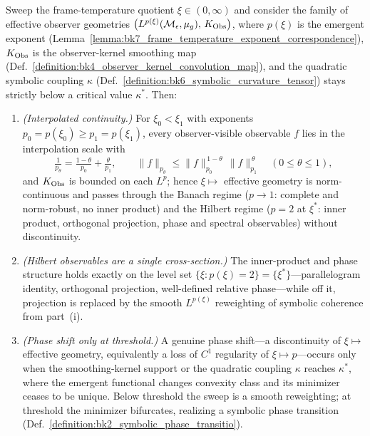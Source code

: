 \begin{theorem}
\label{theorem:bk7_hilbert_banach_bridge}
Sweep the frame-temperature quotient $\xi\in(0,\infty)$ and consider the family of
effective observer geometries
$\bigl(L^{p(\xi)}(\mathcal{M}_{\epsilon},\mu_{g}),\,K_{\mathrm{Obs}}\bigr)$, where
$p(\xi)$ is the emergent exponent
(Lemma~\ref{lemma:bk7_frame_temperature_exponent_correspondence}), $K_{\mathrm{Obs}}$ is
the observer-kernel smoothing map
(Def.~\ref{definition:bk4_observer_kernel_convolution_map}), and the quadratic
symbolic coupling $\kappa$ (Def.~\ref{definition:bk6_symbolic_curvature_tensor})
stays strictly below a critical value $\kappa^{\ast}$. Then:
\begin{enumerate}
\item \emph{(Interpolated continuity.)} For $\xi_{0}<\xi_{1}$ with exponents
$p_{0}=p(\xi_{0})\ge p_{1}=p(\xi_{1})$, every observer-visible observable $f$ lies
in the interpolation scale with
\[
\tfrac{1}{p_{\theta}}=\tfrac{1-\theta}{p_{0}}+\tfrac{\theta}{p_{1}},
\qquad
\lVert f\rVert_{p_{\theta}}\le
\lVert f\rVert_{p_{0}}^{\,1-\theta}\,\lVert f\rVert_{p_{1}}^{\,\theta}
\quad(0\le\theta\le 1),
\]
and $K_{\mathrm{Obs}}$ is bounded on each $L^{p}$; hence $\xi\mapsto$ effective geometry is
norm-continuous and passes through the Banach regime ($p\to 1$: complete and
norm-robust, no inner product) and the Hilbert regime ($p=2$ at $\xi^{\ast}$:
inner product, orthogonal projection, phase and spectral observables) without
discontinuity.
\item \emph{(Hilbert observables are a single cross-section.)} The
inner-product and phase structure holds exactly on the level set
$\{\xi:p(\xi)=2\}=\{\xi^{\ast}\}$---parallelogram identity, orthogonal
projection, well-defined relative phase---while off it, projection is
replaced by the smooth $L^{p(\xi)}$ reweighting of symbolic coherence
from part~(i).
\item \emph{(Phase shift only at threshold.)} A genuine phase shift---a
discontinuity of $\xi\mapsto$ effective geometry, equivalently a loss of $C^{1}$
regularity of $\xi\mapsto p$---occurs only when the smoothing-kernel support or the
quadratic coupling $\kappa$ reaches $\kappa^{\ast}$, where the emergent functional
changes convexity class and its minimizer ceases to be unique. Below threshold the
sweep is a smooth reweighting; at threshold the minimizer bifurcates, realizing a
symbolic phase transition (Def.~\ref{definition:bk2_symbolic_phase_transitio}).
\end{enumerate}
\end{theorem}

